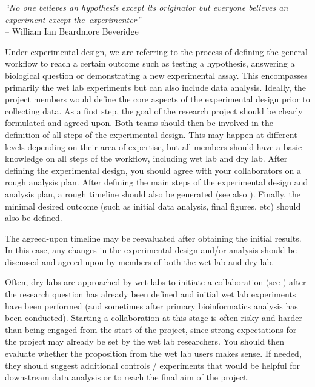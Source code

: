 \documentclass{article}
\begin{document}
\begin{flushright}
\rightskip=1cm\textit{``No one believes an hypothesis except its originator but everyone believes an experiment except the~experimenter''} \\
\vspace{.2em}
\rightskip=0cm -- William Ian Beardmore Beveridge
\end{flushright}

Under experimental design, we are referring to the process of defining the general workflow to reach a certain outcome such as testing a hypothesis, answering a biological question or demonstrating a new experimental assay. This encompasses primarily the wet lab experiments but can also include data analysis. Ideally, the project members would define the core aspects of the experimental design prior to collecting data. As a first step, the goal of the research project should be clearly formulated and agreed upon. Both teams should then be involved in the definition of all steps of the experimental design. This may happen at different levels depending on their area of expertise, but all members should have a basic knowledge on all steps of the workflow, including wet lab and dry lab. After defining the experimental design, you should agree with your collaborators on a rough analysis plan. After defining the main steps of the experimental design and analysis plan, a rough timeline should also be generated (see also ). Finally, the minimal desired outcome (such as initial data analysis, final figures, etc) should also be defined. 

The agreed-upon timeline may be reevaluated after obtaining the initial results. In this case, any changes in the experimental design and/or analysis should be discussed and agreed upon by members of both the wet lab and dry lab. 

Often, dry labs are approached by wet labs to initiate a collaboration (see ) after the research question has already been defined and initial wet lab experiments have been performed (and sometimes after primary bioinformatics analysis has been conducted). Starting a collaboration at this stage is often risky and harder than being engaged from the start of the project, since strong expectations for the project may already be set by the wet lab researchers. You should then evaluate whether the proposition from the wet lab users makes sense. If needed, they should suggest additional controls / experiments that would be helpful for downstream data analysis or to reach the final aim of the project.
\end{document}
